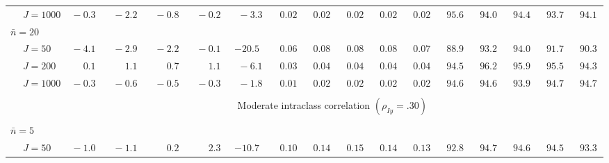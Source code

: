 \begin{sidewaystable}
\begin{threeparttable}
\begin{tabular}{llccccccccccccccc}
 & \nopagebreak $\;J=1000$  & $\phantom{0}{-}0.3\phantom{0}$ & $\phantom{0}{-}2.2\phantom{0}$ & $\phantom{0}{-}0.8\phantom{0}$ & $\phantom{0}{-}0.2\phantom{0}$ & $\phantom{0}{-}3.3\phantom{0}$ & $\phantom{0}0.02\phantom{0}$ & $\phantom{0}0.02\phantom{0}$ & $\phantom{0}0.02\phantom{0}$ & $\phantom{0}0.02\phantom{0}$ & $\phantom{0}0.02\phantom{0}$ & $\phantom{0}95.6\phantom{0}$ & $\phantom{0}94.0\phantom{0}$ & $\phantom{0}94.4\phantom{0}$ & $\phantom{0}93.7\phantom{0}$ & $\phantom{0}94.1\phantom{0}$ \\
\multicolumn{4}{l}{$\bar{n}=20$} \\  & \nopagebreak $\;J=50$  & $\phantom{0}{-}4.1\phantom{0}$ & $\phantom{0}{-}2.9\phantom{0}$ & $\phantom{0}{-}2.2\phantom{0}$ & $\phantom{0}{-}0.1\phantom{0}$ & ${-}20.5\phantom{0}$ & $\phantom{0}0.06\phantom{0}$ & $\phantom{0}0.08\phantom{0}$ & $\phantom{0}0.08\phantom{0}$ & $\phantom{0}0.08\phantom{0}$ & $\phantom{0}0.07\phantom{0}$ & $\phantom{0}88.9\phantom{0}$ & $\phantom{0}93.2\phantom{0}$ & $\phantom{0}94.0\phantom{0}$ & $\phantom{0}91.7\phantom{0}$ & $\phantom{0}90.3\phantom{0}$ \\
 & \nopagebreak $\;J=200$  & $\phantom{0}\phantom{-}0.1\phantom{0}$ & $\phantom{0}\phantom{-}1.1\phantom{0}$ & $\phantom{0}\phantom{-}0.7\phantom{0}$ & $\phantom{0}\phantom{-}1.1\phantom{0}$ & $\phantom{0}{-}6.1\phantom{0}$ & $\phantom{0}0.03\phantom{0}$ & $\phantom{0}0.04\phantom{0}$ & $\phantom{0}0.04\phantom{0}$ & $\phantom{0}0.04\phantom{0}$ & $\phantom{0}0.04\phantom{0}$ & $\phantom{0}94.5\phantom{0}$ & $\phantom{0}96.2\phantom{0}$ & $\phantom{0}95.9\phantom{0}$ & $\phantom{0}95.5\phantom{0}$ & $\phantom{0}94.3\phantom{0}$ \\
 & \nopagebreak $\;J=1000$  & $\phantom{0}{-}0.3\phantom{0}$ & $\phantom{0}{-}0.6\phantom{0}$ & $\phantom{0}{-}0.5\phantom{0}$ & $\phantom{0}{-}0.3\phantom{0}$ & $\phantom{0}{-}1.8\phantom{0}$ & $\phantom{0}0.01\phantom{0}$ & $\phantom{0}0.02\phantom{0}$ & $\phantom{0}0.02\phantom{0}$ & $\phantom{0}0.02\phantom{0}$ & $\phantom{0}0.02\phantom{0}$ & $\phantom{0}94.6\phantom{0}$ & $\phantom{0}94.6\phantom{0}$ & $\phantom{0}93.9\phantom{0}$ & $\phantom{0}94.7\phantom{0}$ & $\phantom{0}94.7\phantom{0}$ \\
[0.5ex]\hline\\[-1.6ex] 
& & \multicolumn{15}{c}{Moderate intraclass correlation $(\rho_{Iy}=.30)$} \\[0.6ex]\hline\\[-1.8ex]
\multicolumn{4}{l}{$\bar{n}=5$} \\  & \nopagebreak $\;J=50$  & $\phantom{0}{-}1.0\phantom{0}$ & $\phantom{0}{-}1.1\phantom{0}$ & $\phantom{0}\phantom{-}0.2\phantom{0}$ & $\phantom{0}\phantom{-}2.3\phantom{0}$ & ${-}10.7\phantom{0}$ & $\phantom{0}0.10\phantom{0}$ & $\phantom{0}0.14\phantom{0}$ & $\phantom{0}0.15\phantom{0}$ & $\phantom{0}0.14\phantom{0}$ & $\phantom{0}0.13\phantom{0}$ & $\phantom{0}92.8\phantom{0}$ & $\phantom{0}94.7\phantom{0}$ & $\phantom{0}94.6\phantom{0}$ & $\phantom{0}94.5\phantom{0}$ & $\phantom{0}93.3\phantom{0}$ \\

\end{tabular}
\end{threeparttable}
\end{sidewaystable}

